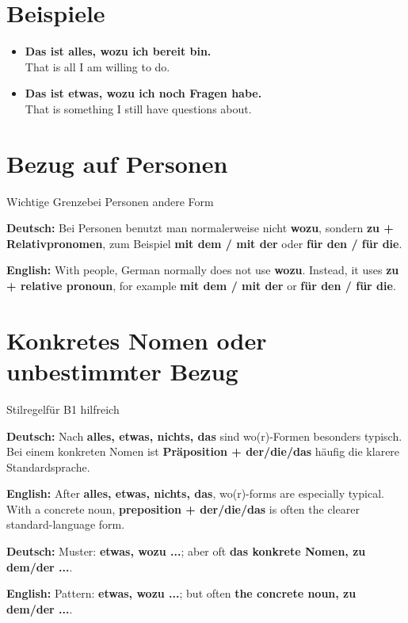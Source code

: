 \documentclass[a4paper,11pt]{article}
\newcommand{\GermanText}[1]{\textbf{Deutsch: }#1\par}
\newcommand{\EnglishText}[1]{{\small\color{SoftGray}\textbf{English: }#1\par}}
\newcommand{\ExampleItem}[2]{\item \textbf{#1}\\{\small\color{SoftGray}#2}}
\begin{document}
\section{Beispiele}

\begin{exbox}

\begin{itemize}

\ExampleItem{Das ist alles, wozu ich bereit bin.}{That is all I am willing to do.}

\ExampleItem{Das ist etwas, wozu ich noch Fragen habe.}{That is something I still have questions about.}

\end{itemize}

\end{exbox}

\section{Bezug auf Personen}

\begin{grammarentry}{Wichtige Grenze}{bei Personen andere Form}

\GermanText{Bei Personen benutzt man normalerweise nicht \textbf{wozu}, sondern \textbf{zu + Relativpronomen}, zum Beispiel \textbf{mit dem / mit der} oder \textbf{für den / für die}.}

\EnglishText{With people, German normally does not use \textbf{wozu}. Instead, it uses \textbf{zu + relative pronoun}, for example \textbf{mit dem / mit der} or \textbf{für den / für die}.}

\end{grammarentry}

\section{Konkretes Nomen oder unbestimmter Bezug}

\begin{grammarentry}{Stilregel}{für B1 hilfreich}

\GermanText{Nach \textbf{alles, etwas, nichts, das} sind wo(r)-Formen besonders typisch. Bei einem konkreten Nomen ist \textbf{Präposition + der/die/das} häufig die klarere Standardsprache.}

\EnglishText{After \textbf{alles, etwas, nichts, das}, wo(r)-forms are especially typical. With a concrete noun, \textbf{preposition + der/die/das} is often the clearer standard-language form.}

\GermanText{Muster: \textbf{etwas, wozu ...}; aber oft \textbf{das konkrete Nomen, zu dem/der ...}.}

\EnglishText{Pattern: \textbf{etwas, wozu ...}; but often \textbf{the concrete noun, zu dem/der ...}.}

\end{grammarentry}
\end{document}

